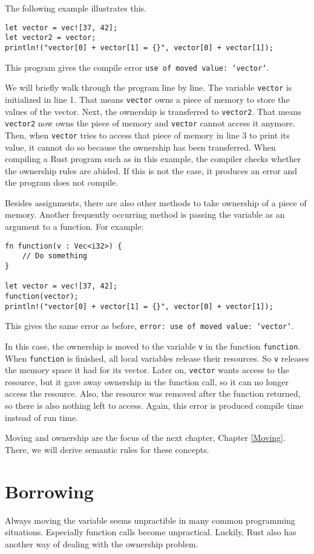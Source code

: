 The following example illustrates this. 
\begin{verbatim}
let vector = vec![37, 42];
let vector2 = vector;
println!("vector[0] + vector[1] = {}", vector[0] + vector[1]);
\end{verbatim}
This program gives the compile error \texttt{use of moved value: `vector`}. 

We will briefly walk through the program line by line. The variable \verb|vector| is initialized in line 1. That means \verb|vector| owns a piece of memory to store the values of the vector. Next, the ownership is transferred to \verb|vector2|. That means \verb|vector2| now owns the piece of memory and \verb|vector| cannot access it anymore. Then, when \verb|vector| tries to access that piece of memory in line 3 to print its value, it cannot do so because the ownership has been transferred. When compiling a Rust program such as in this example, the compiler checks whether the ownership rules are abided. If this is not the case, it produces an error and the program does not compile. 

Besides assignments, there are also other methods to take ownership of a piece of memory. Another frequently occurring method is passing the variable as an argument to a function. For example:

\begin{verbatim}
fn function(v : Vec<i32>) {
    // Do something
}

let vector = vec![37, 42];
function(vector);
println!("vector[0] + vector[1] = {}", vector[0] + vector[1]);
\end{verbatim}
This gives the same error as before, \texttt{error: use of moved value: `vector`}. 

In this case, the ownership is moved to the variable \verb|v| in the function \texttt{function}. When \verb|function| is finished, all local variables release their resources. So \verb|v| releases the memory space it had for its vector. Later on, \verb|vector| wants access to the resource, but it gave away ownership in the function call, so it can no longer access the resource. Also, the resource was removed after the function returned, so there is also nothing left to access. Again, this error is produced compile time instead of run time. 

Moving and ownership are the focus of the next chapter, Chapter \ref{Moving}. There, we will derive semantic rules for these concepts. 

\section{Borrowing}
Always moving the variable seems unpractible in many common programming situations. Especially function calls become unpractical. Luckily, Rust also has another way of dealing with the ownership problem. 

